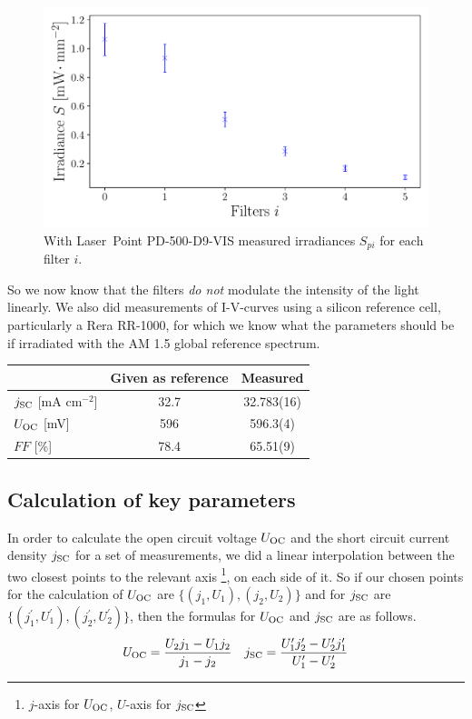 \begin{figure}[h]
\includegraphics[scale=0.5]{../2_Pictures/Photodiode_irradiance.pdf}
\caption{With Laser~Point PD-500-D9-VIS measured irradiances $S_{pi}$ for each filter $i$.}
\label{fig:photodiode_irradiances}
\end{figure}

So we now know that the filters \emph{do not} modulate the intensity of the light linearly.\mypar
We also did measurements of I-V-curves using a silicon reference cell, particularly a Rera RR-1000, for which we know what the parameters should be\cite{reracat} if irradiated with the AM 1.5 global reference spectrum.
\begin{table}[h]
\centering
\begin{tabular}{@{}lcc@{}}\toprule
& Given as reference\cite{reracat} & Measured\\\midrule
$j_{\text{SC}}$ [mA cm$^{-2}$] & 32.7 & 32.783(16) \\
$U_{\text{OC}}$ [mV]& 596 & 596.3(4) \\
$FF$ [\%] & 78.4 & 65.51(9) \\\bottomrule
\end{tabular}
\end{table}



\subsection{Calculation of key parameters}


In order to calculate the open circuit voltage $U_{\text{OC}}$ and the short circuit current density $j_{\text{SC}}$ for a set of measurements, we did a linear interpolation between the two closest points to the relevant axis \footnote{$j$-axis for $U_{\text{OC}}$, $U$-axis for $j_{\text{SC}}$}, on each side of it. So if our chosen points for the calculation of $U_{\text{OC}}$ are $\{(j_1,U_1),(j_2,U_2)\}$ and for $j_{\text{SC}}$ are $\{(j_1^\prime,U_1^\prime),(j_2^\prime,U_2^\prime)\}$, then the formulas for $U_{\text{OC}}$ and $j_{\text{SC}}$ are as follows.
\begin{align}
U_{\text{OC}} = \frac{U_2 j_1 - U_1 j_2}{j_1-j_2}\quad j_{\text{SC}} = \frac{U_1^\prime j_2^\prime - U_2^\prime j_1^\prime}{U_1^\prime-U_2^\prime}
\end{align}

